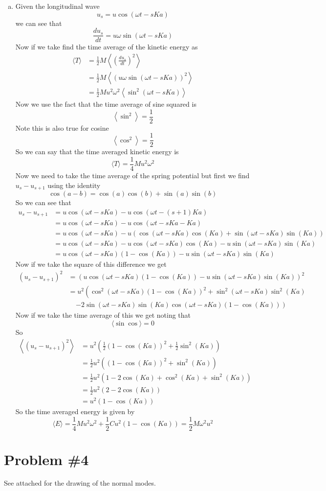 \documentclass[11pt]{article}
\numberwithin{equation}{section}
\begin{document}
\begin{enumerate}[(a)]
\item
Given the longitudinal wave
$$u_s = u\cos(\omega t - sKa)$$
we can see that
$$\frac{du_s}{dt} = u\omega\sin(\omega t - sKa)$$
Now if we take find the time average of the kinetic energy as
\begin{align*}
\langle T\rangle &= \frac{1}{2}M\left\langle\left(\frac{du_s}{dt}\right)^2\right\rangle\\
&= \frac{1}{2}M\left\langle\left(u\omega\sin(\omega t - sKa)\right)^2\right\rangle\\
&= \frac{1}{2}Mu^2\omega^2\left\langle\sin^2(\omega t - sKa)\right\rangle
\end{align*}
Now we use the fact that the time average of sine squared is 
$$\left\langle\sin^2\right\rangle = \frac{1}{2}$$
Note this is also true for cosine 
$$\left\langle\cos^2\right\rangle = \frac{1}{2}$$
So we can say that the time averaged kinetic energy is
$$\langle T\rangle= \frac{1}{4}Mu^2\omega^2$$
Now we need to take the time average of the spring potential but first we find $u_s-u_{s+1}$ using the identity
$$\cos(a-b) = \cos(a)\cos(b)+\sin(a)\sin(b)$$
So we can see that
\begin{align*}
u_s - u_{s+1} &= u\cos(\omega t - sKa) - u\cos(\omega t - (s+1)Ka)\\
&= u\cos(\omega t - sKa) - u\cos(\omega t - sKa - Ka)\\
&= u\cos(\omega t - sKa) - u\left(\cos(\omega t - sKa)\cos(Ka) + \sin(\omega t - sKa)\sin(Ka)\right)\\
&= u\cos(\omega t - sKa) - u\cos(\omega t - sKa)\cos(Ka) - u\sin(\omega t - sKa)\sin(Ka)\\
&= u\cos(\omega t - sKa)(1 - \cos(Ka)) - u\sin(\omega t - sKa)\sin(Ka)
\end{align*}
Now if we take the square of this difference we get
\begin{align*}
(u_s-u_{s+1})^2 &= \left(u\cos(\omega t - sKa)(1 - \cos(Ka)) - u\sin(\omega t - sKa)\sin(Ka)\right)^2\\
&= u^2\left(\cos^2(\omega t - sKa)(1 - \cos(Ka))^2 + \sin^2(\omega t - sKa)\sin^2(Ka)\right.\\
& \ \ \ \ \ \left.-2\sin(\omega t - sKa)\sin(Ka)\cos(\omega t - sKa)(1 - \cos(Ka))\right)
\end{align*}
Now if we take the time average of this we get noting that
$$\langle\sin\cos\rangle = 0$$
So
\begin{align*}
\left\langle(u_s-u_{s+1})^2\right\rangle &= u^2\left(\frac{1}{2}(1 - \cos(Ka))^2 + \frac{1}{2}\sin^2(Ka)\right)\\
&= \frac{1}{2}u^2\left((1 - \cos(Ka))^2 + \sin^2(Ka)\right)\\
&= \frac{1}{2}u^2\left(1 - 2\cos(Ka) + \cos^2(Ka) + \sin^2(Ka)\right)\\
&= \frac{1}{2}u^2\left(2 - 2\cos(Ka)\right)\\
&= u^2\left(1 - \cos(Ka)\right)
\end{align*}
So the time averaged energy is given by
$$\langle E\rangle = \frac{1}{4}Mu^2\omega^2 + \frac{1}{2}Cu^2\left(1 - \cos(Ka)\right) = \frac{1}{2}M\omega^2u^2$$
\end{enumerate}

\section{Problem \#4}
See attached for the drawing of the normal modes.
\end{document}
